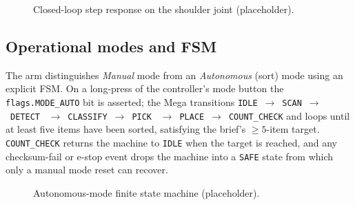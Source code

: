 \begin{figure}[t]
  \centering
  \caption{Closed-loop step response on the shoulder joint (placeholder).}
  \label{fig:stepresp}
\end{figure}

\subsection{Operational modes and FSM}
\label{sec:fsm}
The arm distinguishes \emph{Manual} mode from an
\emph{Autonomous} (sort) mode using an explicit FSM. On a long-press
of the controller's mode button the
\texttt{flags.MODE\_AUTO} bit is asserted; the Mega transitions
\texttt{IDLE}~$\rightarrow$~\texttt{SCAN}~$\rightarrow$~\texttt{DETECT}
~$\rightarrow$~\texttt{CLASSIFY}~$\rightarrow$~\texttt{PICK}
~$\rightarrow$~\texttt{PLACE}~$\rightarrow$~\texttt{COUNT\_CHECK}
and loops until at least five items have been sorted, satisfying the
brief's $\geq 5$-item target. \texttt{COUNT\_CHECK} returns the
machine to \texttt{IDLE} when the target is reached, and any
checksum-fail or e-stop event drops the machine into a
\texttt{SAFE} state from which only a manual mode reset can recover.

\begin{figure}[t]
  \centering
  \caption{Autonomous-mode finite state machine (placeholder).}
  \label{fig:fsm}
\end{figure}


